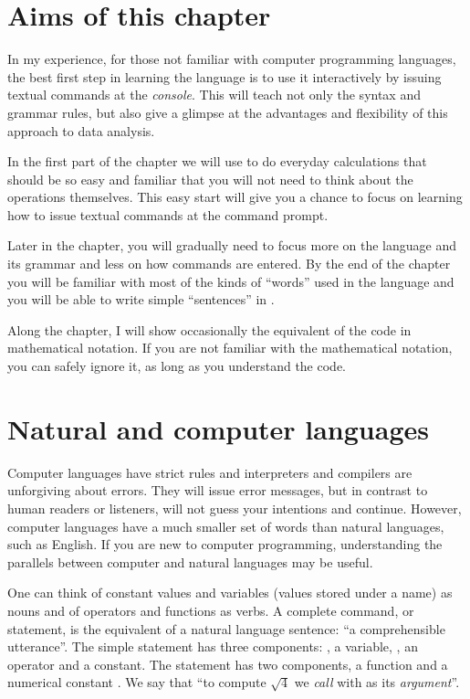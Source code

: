 \documentclass[krantz2]{krantz}\usepackage{knitr}%
\begin{document}
\section{Aims of this chapter}

In my experience, for those not familiar with computer programming languages, the best first step in learning the \Rlang language is to use it interactively by issuing textual commands at the \emph{console}. This will teach not only the syntax and grammar rules, but also give a glimpse at the advantages and flexibility of this approach to data analysis.

In the first part of the chapter we will use \Rlang to do everyday calculations that should be so easy and familiar that you will not need to think about the operations themselves. This easy start will give you a chance to focus on learning how to issue textual commands at the command prompt.

Later in the chapter, you will gradually need to focus more on the \Rlang language and its grammar and less on how commands are entered. By the end of the chapter you will be familiar with most of the kinds of ``words'' used in the \Rlang language and you will be able to write simple ``sentences'' in \Rlang.

Along the chapter, I will show occasionally the equivalent of the \Rlang code in mathematical notation. If you are not familiar with the mathematical notation, you can safely ignore it, as long as you understand the \Rlang code.

\section{Natural and computer languages}
Computer languages have strict rules and interpreters and compilers are unforgiving about errors. They will issue error messages, but in contrast to human readers or listeners, will not guess your intentions and continue. However, computer languages have a much smaller set of words than natural languages, such as English. If you are new to computer programming, understanding the parallels between computer and natural languages may be useful.

One can think of constant values and variables (values stored under a name) as nouns and of operators and functions as verbs. A complete command, or statement, is the equivalent of a natural language sentence: ``a comprehensible utterance''. The simple statement  has three components: , a variable, \code{+}, an operator and  a constant. The statement  has two components, a function  and a numerical constant . We say that ``to compute $\sqrt{4}$ we \emph{call}  with  as its \emph{argument}''.
\end{document}
